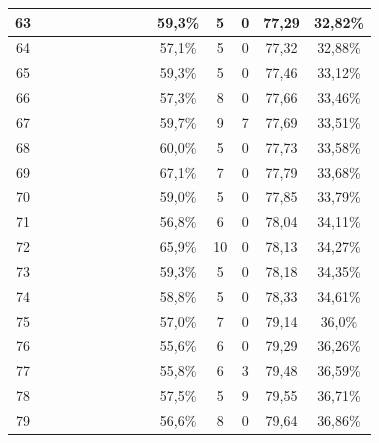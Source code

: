 \begin{longtable}{|c|c|c|c|c|c|c|c|c|c|c|c|c|c|}
63 &  \x    & \x    & \x    & \x    & \x    & \x    &       &       & 59,3\% &  5  & 0  & 77,29 & 32,82\% \\ \hline
64 &  \x    & \x    & \x    &       &       & \x\m  & \x    &       & 57,1\% &  5  & 0  & 77,32 & 32,88\% \\ \hline
65 &  \x    & \x    & \x    &       & \x    & \x    &       & \x\m  & 59,3\% &  5  & 0  & 77,46 & 33,12\% \\ \hline
66 &  \x    & \x    & \x    & \x    &       &       &       &       & 57,3\% &  8  & 0  & 77,66 & 33,46\% \\ \hline
67 &  \x    & \x    &       &       & \x    &       &       &       & 59,7\% &  9  & 7  & 77,69 & 33,51\% \\ \hline
68 &  \x    & \x    & \x    &       & \x    & \x\m  & \x\m  &       & 60,0\% &  5  & 0  & 77,73 & 33,58\% \\ \hline
69 &  \x    & \x    &       & \x    & \x\m  &       &       &       & 67,1\% &  7  & 0  & 77,79 & 33,68\% \\ \hline
70 &  \x    & \x    & \x    & \x    & \x    & \x\m  & \x    &       & 59,0\% &  5  & 0  & 77,85 & 33,79\% \\ \hline
71 &  \x    & \x    & \x    & \x    &       & \x    &       &       & 56,8\% &  6  & 0  & 78,04 & 34,11\% \\ \hline
72 &  \x    & \x    &       &       & \x\m  &       & \x\m  &       & 65,9\% &  10 & 0  & 78,13 & 34,27\% \\ \hline
73 &  \x    & \x    & \x    &       & \x    & \x\m  &       & \x    & 59,3\% &  5  & 0  & 78,18 & 34,35\% \\ \hline
74 &  \x    & \x    & \x    & \x    &       & \x\m  & \x\m  &       & 58,8\% &  5  & 0  & 78,33 & 34,61\% \\ \hline
75 &  \x    & \x    & \x    & \x    &       &       &       & \x\m  & 57,0\% &  7  & 0  & 79,14 & 36,0\% \\ \hline
76 &  \x    & \x    & \x    &       &       &       &       &       & 55,6\% &  6  & 0  & 79,29 & 36,26\% \\ \hline
77 &  \x    & \x    & \x    &       &       & \x\m  &       & \x\m  & 55,8\% &  6  & 3  & 79,48 & 36,59\% \\ \hline
78 &  \x    & \x    & \x    & \x    &       & \x\m  &       & \x\m  & 57,5\% &  5  & 9  & 79,55 & 36,71\% \\ \hline
79 &  \x    & \x    & \x    &       &       &       &       & \x\m  & 56,6\% &  8  & 0  & 79,64 & 36,86\% \\ \hline

\end{longtable}
